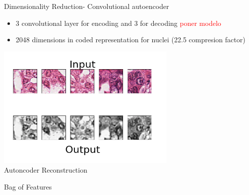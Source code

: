 \documentclass[usenames,dvipsnames]{beamer}
\begin{document}
%

\begin{frame}{Dimensionality Reduction- Convolutional autoencoder}
\begin{itemize}
    \item 3 convolutional layer for encoding and 3 for decoding \textcolor{red}{poner modelo}
    \item 2048 dimensions in coded representation for nuclei (22.5 compresion factor)
\end{itemize}
    \centering
    \includegraphics[width=0.65\textwidth]{imagenes_cnn/autoencoderresponse.png}
    \\Autoncoder Reconstruction
\end{frame}


\begin{frame}{Bag of Features}

\end{frame}
\end{document}
